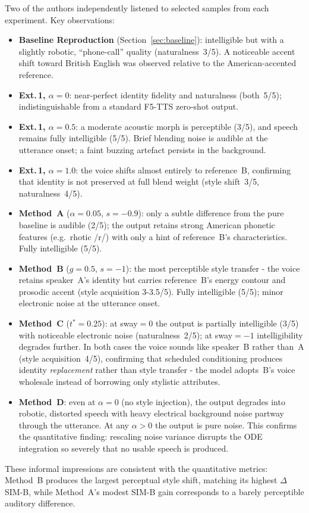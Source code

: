 \documentclass[11pt,a4paper,twocolumn]{article}
\begin{document}
Two of the authors independently listened to selected samples from each
experiment.  Key observations:
\begin{itemize}[leftmargin=*]
  \item \textbf{Baseline Reproduction} (Section~\ref{sec:baseline}): intelligible but
    with a slightly robotic, ``phone-call'' quality (naturalness~3/5).
    A noticeable accent shift toward British English was observed relative
    to the American-accented reference.
  \item \textbf{Ext.\,1, $\alpha{=}0$}: near-perfect identity fidelity and
    naturalness (both~5/5); indistinguishable from a standard F5-TTS
    zero-shot output.
  \item \textbf{Ext.\,1, $\alpha{=}0.5$}: a moderate acoustic morph is
    perceptible (3/5), and speech remains fully intelligible (5/5).
    Brief blending noise is audible at the utterance onset;
    a faint buzzing artefact persists in the background.
  \item \textbf{Ext.\,1, $\alpha{=}1.0$}: the voice shifts almost entirely
    to reference~B, confirming that identity is not preserved at full
    blend weight (style shift~3/5, naturalness~4/5).
  \item \textbf{Method~A} ($\alpha{=}0.05$, $s{=}{-}0.9$): only a subtle
    difference from the pure baseline is audible (2/5); the output retains
    strong American phonetic features (e.g.\ rhotic /r/) with only a hint
    of reference~B's characteristics.  Fully intelligible (5/5).
  \item \textbf{Method~B} ($g{=}0.5$, $s{=}{-}1$): the most perceptible
    style transfer - the voice retains speaker~A's identity but carries
    reference~B's energy contour and prosodic accent (style acquisition
    3-3.5/5).  Fully intelligible (5/5); minor electronic noise at the
    utterance onset.
  \item \textbf{Method~C} ($t^*{=}0.25$): at sway$=0$ the output is
    partially intelligible (3/5) with noticeable electronic noise
    (naturalness~2/5); at sway$=-1$ intelligibility degrades further.
    In both cases the voice sounds like speaker~B rather than~A
    (style acquisition~4/5), confirming that scheduled conditioning
    produces identity {\em replacement} rather than style transfer - the
    model adopts~B's voice wholesale instead of borrowing only stylistic
    attributes.
  \item \textbf{Method~D}: even at $\alpha{=}0$ (no style injection),
    the output degrades into robotic, distorted speech with heavy
    electrical background noise partway through the utterance.
    At any $\alpha>0$ the output is pure noise.  This confirms the
    quantitative finding: rescaling noise variance disrupts the ODE
    integration so severely that no usable speech is produced.
\end{itemize}
These informal impressions are consistent with the quantitative metrics:
Method~B produces the largest perceptual style shift, matching its
highest $\Delta$SIM-B, while Method~A's modest SIM-B gain corresponds to
a barely perceptible auditory difference.
\end{document}
